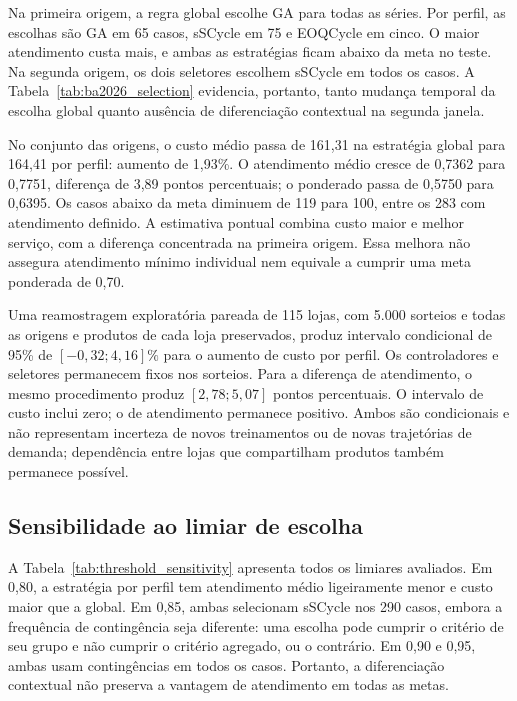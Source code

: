 Na primeira origem, a regra global escolhe GA para todas as séries. Por perfil, as escolhas são GA em 65 casos, sSCycle em 75 e EOQCycle em cinco. O maior atendimento custa mais, e ambas as estratégias ficam abaixo da meta no teste. Na segunda origem, os dois seletores escolhem sSCycle em todos os casos. A Tabela~\ref{tab:ba2026_selection} evidencia, portanto, tanto mudança temporal da escolha global quanto ausência de diferenciação contextual na segunda janela.

No conjunto das origens, o custo médio passa de 161,31 na estratégia global para 164,41 por perfil: aumento de 1,93\%. O atendimento médio cresce de 0,7362 para 0,7751, diferença de 3,89 pontos percentuais; o ponderado passa de 0,5750 para 0,6395. Os casos abaixo da meta diminuem de 119 para 100, entre os 283 com atendimento definido. A estimativa pontual combina custo maior e melhor serviço, com a diferença concentrada na primeira origem. Essa melhora não assegura atendimento mínimo individual nem equivale a cumprir uma meta ponderada de 0,70.

Uma reamostragem exploratória pareada de 115 lojas, com 5.000 sorteios e todas as origens e produtos de cada loja preservados, produz intervalo condicional de 95\% de $[-0{,}32;4{,}16]\%$ para o aumento de custo por perfil. Os controladores e seletores permanecem fixos nos sorteios. Para a diferença de atendimento, o mesmo procedimento produz $[2{,}78;5{,}07]$ pontos percentuais. O intervalo de custo inclui zero; o de atendimento permanece positivo. Ambos são condicionais e não representam incerteza de novos treinamentos ou de novas trajetórias de demanda; dependência entre lojas que compartilham produtos também permanece possível.

\subsection{Sensibilidade ao limiar de escolha}

A Tabela~\ref{tab:threshold_sensitivity} apresenta todos os limiares avaliados. Em 0,80, a estratégia por perfil tem atendimento médio ligeiramente menor e custo maior que a global. Em 0,85, ambas selecionam sSCycle nos 290 casos, embora a frequência de contingência seja diferente: uma escolha pode cumprir o critério de seu grupo e não cumprir o critério agregado, ou o contrário. Em 0,90 e 0,95, ambas usam contingências em todos os casos. Portanto, a diferenciação contextual não preserva a vantagem de atendimento em todas as metas.

